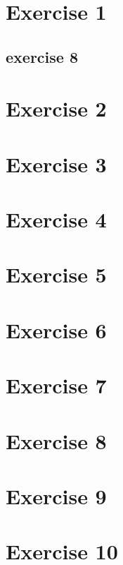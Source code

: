\documentclass[twoside, a4paper, fleqn, reqno]{article}
\begin{document}
\maketitle

\section*{Exercise 1}
\subsection*{exercise 8}

\section*{Exercise 2}

\section*{Exercise 3}

\section*{Exercise 4}

\section*{Exercise 5}

\section*{Exercise 6}

\section*{Exercise 7}

\section*{Exercise 8}

\section*{Exercise 9}

\section*{Exercise 10}
\end{document}
